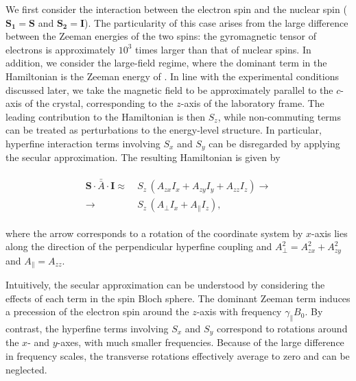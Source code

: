 We first consider the interaction between the \Er electron spin and the \W nuclear spin ($\mathbf{S_1}=\mathbf{S}$ and $\mathbf{S_2}=\mathbf{I}$). The particularity of this case arises from the large difference between the Zeeman energies of the two spins: the gyromagnetic tensor of electrons is approximately $10^3$ times larger than that of nuclear spins. In addition, we consider the large-field regime, where the dominant term in the Hamiltonian is the Zeeman energy of \Er. In line with the experimental conditions discussed later, we take the magnetic field to be approximately parallel to the $c$-axis of the crystal, corresponding to the $z$-axis of the laboratory frame. The leading contribution to the Hamiltonian is then $S_z$, while non-commuting terms can be treated as perturbations to the energy-level structure. In particular, hyperfine interaction terms involving $S_x$ and $S_y$ can be disregarded by applying the secular approximation. The resulting Hamiltonian is given by

\begin{align}
\begin{split}
    \mathbf{S}\cdot\bar{\bar{A}}\cdot\mathbf{I} \approx&\ S_z\,\left(A_{zx}I_x+A_{zy}I_y+A_{zz}I_z\right) \rightarrow \\
    \rightarrow &\ S_z \, \left(A_\perp I_x + A_\parallel I_z\right),
\end{split}
\end{align}

\noindent where the arrow corresponds to a rotation of the coordinate system by $x$-axis lies along the direction of the perpendicular hyperfine coupling and $A_\perp^2 = A_{zx}^2+A_{zy}^2$ and $A_\parallel = A_{zz}$.

Intuitively, the secular approximation can be understood by considering the effects of each term in the \Er spin Bloch sphere. The dominant Zeeman term induces a precession of the electron spin around the $z$-axis with frequency $\gamma_\parallel B_0$. By contrast, the hyperfine terms involving $S_x$ and $S_y$ correspond to rotations around the $x$- and $y$-axes, with much smaller frequencies. Because of the large difference in frequency scales, the transverse rotations effectively average to zero and can be neglected.

